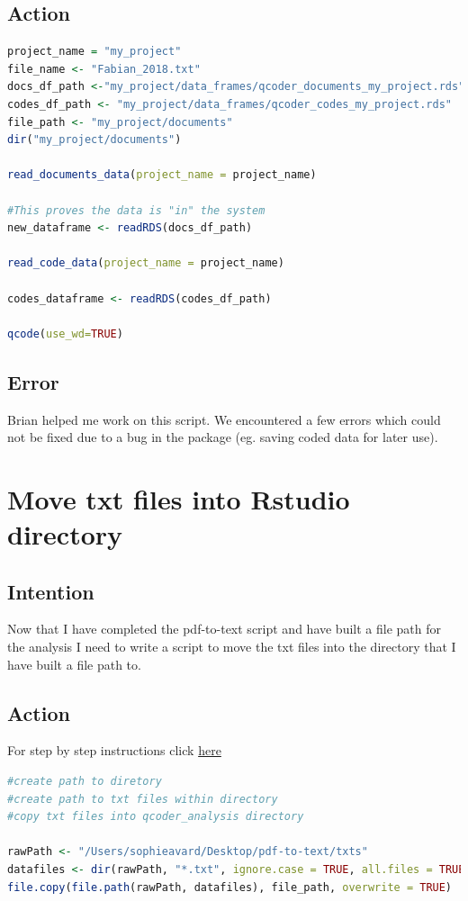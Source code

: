 \documentclass{article}
\begin{document}
\subsection{Action}
\begin{lstlisting}[language=R]
project_name = "my_project"
file_name <- "Fabian_2018.txt"
docs_df_path <-"my_project/data_frames/qcoder_documents_my_project.rds"
codes_df_path <- "my_project/data_frames/qcoder_codes_my_project.rds"
file_path <- "my_project/documents"
dir("my_project/documents")

read_documents_data(project_name = project_name)

#This proves the data is "in" the system
new_dataframe <- readRDS(docs_df_path)

read_code_data(project_name = project_name)

codes_dataframe <- readRDS(codes_df_path)

qcode(use_wd=TRUE)

\end{lstlisting}

\subsection{Error}
Brian helped me work on this script. We encountered a few errors which could not be fixed due to a bug in the package (eg. saving coded data for later use). 


\section{Move txt files into Rstudio directory}
\subsection{Intention}
Now that I have completed the pdf-to-text script and have built a file path for the analysis I need to write a script to move the txt files into the directory that I have built a file path to. 

\subsection{Action}
For step by step instructions click \href{https://stackoverflow.com/questions/49593823/r-file-copy-function}{here}
\begin{lstlisting}[language=R]
#create path to diretory
#create path to txt files within directory
#copy txt files into qcoder_analysis directory

rawPath <- "/Users/sophieavard/Desktop/pdf-to-text/txts"
datafiles <- dir(rawPath, "*.txt", ignore.case = TRUE, all.files = TRUE)
file.copy(file.path(rawPath, datafiles), file_path, overwrite = TRUE)
\end{lstlisting}
\end{document}
